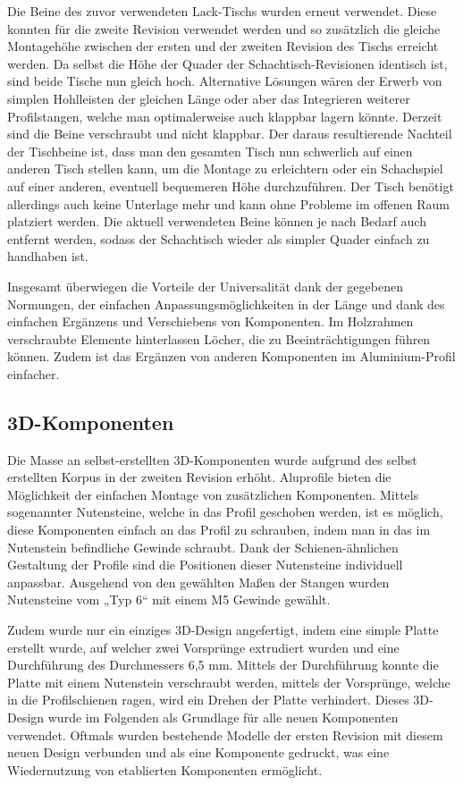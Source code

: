 Die Beine des zuvor verwendeten Lack-Tischs wurden erneut verwendet.
Diese konnten für die zweite Revision verwendet werden und so zusätzlich
die gleiche Montagehöhe zwischen der ersten und der zweiten Revision des
Tischs erreicht werden. Da selbst die Höhe der Quader der
Schachtisch-Revisionen identisch ist, sind beide Tische nun gleich hoch.
Alternative Lösungen wären der Erwerb von simplen Hohlleisten der
gleichen Länge oder aber das Integrieren weiterer Profilstangen, welche
man optimalerweise auch klappbar lagern könnte. Derzeit sind die Beine
verschraubt und nicht klappbar. Der daraus resultierende Nachteil der
Tischbeine ist, dass man den gesamten Tisch nun schwerlich auf einen
anderen Tisch stellen kann, um die Montage zu erleichtern oder ein
Schachspiel auf einer anderen, eventuell bequemeren Höhe durchzuführen.
Der Tisch benötigt allerdings auch keine Unterlage mehr und kann ohne
Probleme im offenen Raum platziert werden. Die aktuell verwendeten Beine
können je nach Bedarf auch entfernt werden, sodass der Schachtisch
wieder als simpler Quader einfach zu handhaben ist.

Insgesamt überwiegen die Vorteile der Universalität dank der gegebenen
Normungen, der einfachen Anpassungsmöglichkeiten in der Länge und dank
des einfachen Ergänzens und Verschiebens von Komponenten. Im Holzrahmen
verschraubte Elemente hinterlassen Löcher, die zu Beeinträchtigungen
führen können. Zudem ist das Ergänzen von anderen Komponenten im
Aluminium-Profil einfacher.

\hypertarget{d-komponenten}{%
\subsection{3D-Komponenten}\label{d-komponenten}}

Die Masse an selbst-erstellten 3D-Komponenten wurde aufgrund des selbst
erstellten Korpus in der zweiten Revision erhöht. Aluprofile bieten die
Möglichkeit der einfachen Montage von zusätzlichen Komponenten. Mittels
sogenannter Nutensteine, welche in das Profil geschoben werden, ist es
möglich, diese Komponenten einfach an das Profil zu schrauben, indem man
in das im Nutenstein befindliche Gewinde schraubt. Dank der
Schienen-ähnlichen Gestaltung der Profile sind die Positionen dieser
Nutensteine individuell anpassbar. Ausgehend von den gewählten Maßen der
Stangen wurden Nutensteine vom „Typ 6`` mit einem M5 Gewinde gewählt.

Zudem wurde nur ein einziges 3D-Design angefertigt, indem eine simple
Platte erstellt wurde, auf welcher zwei Vorsprünge extrudiert wurden und
eine Durchführung des Durchmessers 6,5 mm. Mittels der Durchführung
konnte die Platte mit einem Nutenstein verschraubt werden, mittels der
Vorsprünge, welche in die Profilschienen ragen, wird ein Drehen der
Platte verhindert. Dieses 3D-Design wurde im Folgenden als Grundlage für
alle neuen Komponenten verwendet. Oftmals wurden bestehende Modelle der
ersten Revision mit diesem neuen Design verbunden und als eine
Komponente gedruckt, was eine Wiedernutzung von etablierten Komponenten
ermöglicht.

